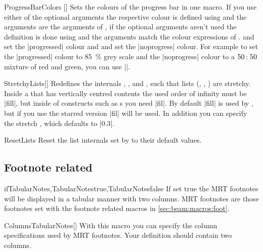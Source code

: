 \begin{describemacro}{ProgressBarColors}
  []
  Sets the colours of the progress bar in one macro. If you use either of the
  optional arguments the respective colour is defined using  and
  the  arguments are the  arguments of ,
  if the optional arguments aren't used the definition is done using
   and the  arguments match the colour expressions of
  .  and  set the |progressed| colour
  and  and  set the |noprogress| colour. For
  example to set the |progressed| colour to \SI{85}{\percent} grey scale and the
  |noprogress| colour to a $50\mkern-1.5mu:50$ mixture of red and green, you can
  use ||.
\end{describemacro}

\begin{describemacro}{StretchyLists}[\meta{*}]
  Redefines the internals , , and , such
  that lists (, , ) are stretchy.
  Inside a   that has vertically centred contents the
  used order of infinity must be |fill|, but inside of constructs such as
  s you need |fil|. By default |fill| is used by
  , but if you use the starred version |fil| will be used. In
  addition you can specify the stretch , which defaults to |0.3|.
\end{describemacro}

\begin{describemacro}{ResetLists}
  Reset the list internals set by  to their default values.
\end{describemacro}

\subsection{Footnote related}
\begin{describemacro}{ifTabularNotes,TabularNotestrue,TabularNotesfalse}
  If set true the MRT footnotes will be displayed in a tabular manner with two
  columns. MRT footnotes are those footnotes set with the footnote related
  macros in \autoref{sec:beam:macros:foot}.
\end{describemacro}

\begin{describemacro}{ColumnsTabularNotes}[]
  With this macro you can specify the column specifications used by MRT
  footnotes. Your definition should contain two columns.
\end{describemacro}


